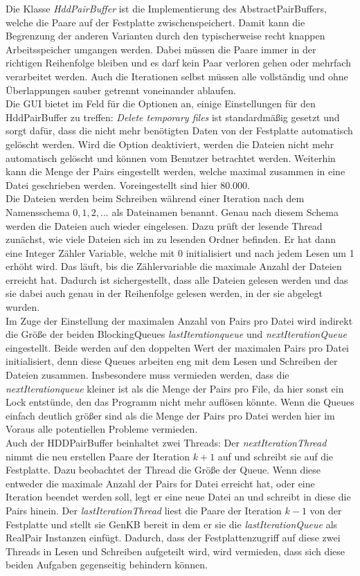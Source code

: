 \documentclass[12pt,a4paper]{article}
\begin{document}
Die Klasse \textit{HddPairBuffer} ist die Implementierung des AbstractPairBuffers, welche die Paare auf der Festplatte zwischenspeichert. Damit kann die Begrenzung der anderen Varianten durch den typischerweise recht knappen Arbeitsspeicher umgangen werden. Dabei müssen die Paare immer in der richtigen Reihenfolge bleiben und es darf kein Paar verloren gehen oder mehrfach verarbeitet werden. Auch die Iterationen selbst müssen alle vollständig und ohne Überlappungen sauber getrennt voneinander ablaufen.\\
Die GUI bietet im Feld für die Optionen an, einige Einstellungen für den HddPairBuffer zu treffen: \textit{Delete temporary files} ist standardmäßig gesetzt und sorgt dafür, dass die nicht mehr benötigten Daten von der Festplatte automatisch gelöscht werden. Wird die Option deaktiviert, werden die Dateien nicht mehr automatisch gelöscht und können vom Benutzer betrachtet werden. Weiterhin kann die Menge der Pairs eingestellt werden, welche maximal  zusammen in eine Datei geschrieben werden. Voreingestellt sind hier 80.000. \\
Die Dateien werden beim Schreiben während einer Iteration nach dem Namensschema $0, 1, 2, ...$  als Dateinamen benannt. Genau nach diesem Schema werden die Dateien auch wieder eingelesen. Dazu prüft der lesende Thread zunächst, wie viele Dateien sich im zu lesenden Ordner befinden. Er hat dann eine Integer Zähler Variable, welche mit 0 initialisiert und nach jedem Lesen um 1 erhöht wird. Das läuft, bis die Zählervariable die maximale Anzahl der Dateien erreicht hat. Dadurch ist sichergestellt, dass alle Dateien gelesen werden und das sie dabei auch genau in der Reihenfolge gelesen werden, in der sie abgelegt wurden. \\
Im Zuge der Einstellung der maximalen Anzahl von Pairs pro Datei wird indirekt die Größe der beiden BlockingQueues \textit{lastIterationqueue} und \textit{nextIterationQueue} eingestellt. Beide werden auf den doppelten Wert der maximalen Pairs pro Datei initialisiert, denn diese Queues arbeiten eng mit dem Lesen und Schreiben der Dateien zusammen. Insbesondere muss vermieden werden, dass die \textit{nextIterationqueue} kleiner ist als die Menge der Pairs pro File, da hier sonst ein Lock entstünde, den das Programm nicht mehr auflösen könnte. Wenn die Queues einfach deutlich größer sind als die Menge der Pairs pro Datei werden hier im Voraus alle potentiellen Probleme vermieden. \\
Auch der HDDPairBuffer beinhaltet zwei Threads: Der \textit{nextIterationThread} nimmt die neu erstellen Paare der Iteration $k+1$ auf und schreibt sie auf die Festplatte. Dazu beobachtet der Thread die Größe der Queue. Wenn diese entweder die maximale Anzahl der Pairs for Datei erreicht hat, oder eine Iteration beendet werden soll, legt er eine neue Datei an und schreibt in diese die Pairs hinein. Der \textit{lastIterationThread} liest die Paare der Iteration $k-1$ von der Festplatte und stellt sie GenKB bereit in dem er sie die \textit{lastIterationQueue} als RealPair Instanzen einfügt. Dadurch, dass der Festplattenzugriff auf diese zwei Threads in Lesen und Schreiben aufgeteilt wird, wird vermieden, dass sich diese beiden Aufgaben gegenseitig behindern können. \\
\end{document}
